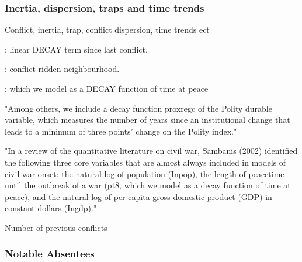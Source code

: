 \documentclass[a4paper]{article}
\begin{document}
\subsubsection{Inertia, dispersion, traps and time trends} %


Conflict, inertia, trap, conflict dispersion, time trends ect

\cite{Collier_Hoeffler_2004} : linear DECAY term since last conflict.

\cite{Goldstone_2010} : conflict ridden neighbourhood.

\cite{Hegre_Sambanis_2006} : which we model as a DECAY function of time at peace

"Among others, we include a decay function proxregc of the Polity
durable variable, which measures the number of years since an institutional change
that leads to a minimum of three points' change on the Polity index."

"In a review of the quantitative literature on civil war, Sambanis
(2002) identified the following three core variables that are almost always included
in models of civil war onset: the natural log of population (Inpop), the length of
peacetime until the outbreak of a war (pt8, which we model as a decay function of
time at peace), and the natural log of per capita gross domestic product (GDP) in
constant dollars (Ingdp)."





\cite{Cederman_Gleditsch_Buhaug_2013} Number of previous conflicts



\subsubsection{Notable Absentees}\label{notable_absentees} %
\end{document}
